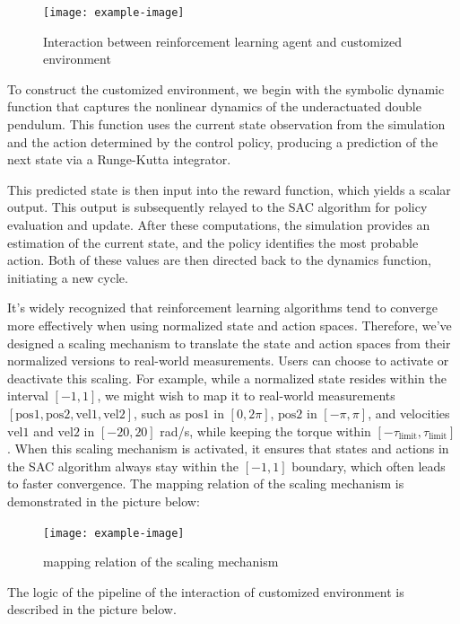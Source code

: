 \begin{figure}[htbp]
    \centering
    \texttt{[image: example-image]}
    \caption{Interaction between reinforcement learning agent and customized environment}
    \label{fig:my_label}
\end{figure}

To construct the customized environment, we begin with the symbolic dynamic function that captures the nonlinear dynamics of the underactuated double pendulum. This function uses the current state observation from the simulation and the action determined by the control policy, producing a prediction of the next state via a Runge-Kutta integrator.

This predicted state is then input into the reward function, which yields a scalar output. This output is subsequently relayed to the SAC algorithm for policy evaluation and update. After these computations, the simulation provides an estimation of the current state, and the policy identifies the most probable action. Both of these values are then directed back to the dynamics function, initiating a new cycle.

It's widely recognized \cite{some paper} that reinforcement learning algorithms tend to converge more effectively when using normalized state and action spaces. Therefore, we've designed a scaling mechanism to translate the state and action spaces from their normalized versions to real-world measurements. Users can choose to activate or deactivate this scaling. For example, while a normalized state resides within the interval \( [-1,1] \), we might wish to map it to real-world measurements \( \left[ \text{pos1}, \text{pos2}, \text{vel1}, \text{vel2} \right] \), such as \( \text{pos1} \) in \( [0,2\pi] \), \( \text{pos2} \) in \( [-\pi,\pi] \), and velocities \( \text{vel1} \) and \( \text{vel2} \) in \( [-20,20] \) rad/s, while keeping the torque within \( [-\tau_{\text{limit}}, \tau_{\text{limit}}] \). When this scaling mechanism is activated, it ensures that states and actions in the SAC algorithm always stay within the \( [-1,1] \) boundary, which often leads to faster convergence. The mapping relation of the scaling mechanism is demonstrated in the picture below:

\begin{figure}[H]
    \centering
    \texttt{[image: example-image]}
    \caption{mapping relation of the scaling mechanism}
    \label{fig:my_label}
\end{figure}

The logic of the pipeline of the interaction of customized environment is described in the picture below.

